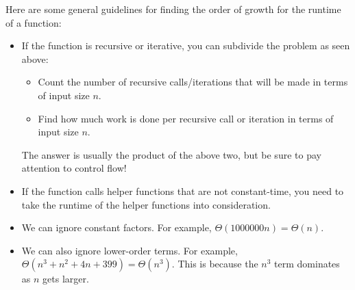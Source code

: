 Here are some general guidelines for finding the order of growth for the
runtime of a function:

\begin{itemize}
\item If the function is recursive or iterative, you can subdivide the problem
    as seen above:
    \begin{itemize}
        \item Count the number of recursive calls/iterations that will be made
            in terms of input size $n$.
        \item Find how much work is done per recursive call or iteration in
            terms of input size $n$.
    \end{itemize}
    The answer is usually the product of the above two, but be sure to pay
    attention to control flow!
\item If the function calls helper functions that are not constant-time, you
    need to take the runtime of the helper functions into consideration.
\item We can ignore constant factors. For example,  $\Theta(1000000n) =
    \Theta(n)$.
\item We can also ignore lower-order terms. For example, $\Theta(n^3 + n^2 + 4n
    + 399) = \Theta(n^3)$. This is because the $n^{3}$ term dominates as $n$
    gets larger.
\end{itemize}

